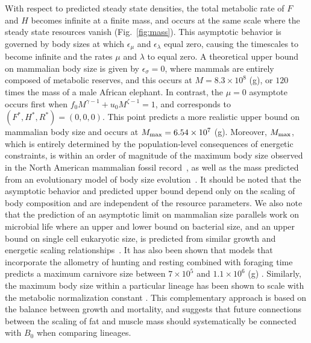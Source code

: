 \documentclass[twocolumn,preprintnumbers,amsmath,amssymb,superscriptaddress]{revtex4}
\begin{document}
With respect to predicted steady state densities, the total metabolic rate of $F$ and $H$ becomes infinite at a finite mass, and occurs at the same scale where the steady state resources vanish (Fig.~\ref{fig:mass}). This asymptotic behavior is governed by body sizes at which $\epsilon_{\mu}$ and $\epsilon_{\lambda}$ equal zero, causing the timescales to become infinite and the rates $\mu$ and $\lambda$ to equal zero.
A theoretical upper bound on mammalian body size is given by $\epsilon_\sigma=0$, where mammals are entirely composed of metabolic reserves, and this occurs at $M=8.3\times 10^8$ (g), or $120$ times the mass of a male African elephant.
In contrast, the $\mu=0$ asymptote occurs first when $f_{0}M^{\gamma-1}+u_{0}M^{\zeta-1}=1$, and corresponds to $(F^*,H^*,R^*)=(0,0,0)$. 
This point predicts a more realistic upper bound on mammalian body size and occurs at $M_{\rm max}=6.54\times10^7$ (g).
Moreover, $M_{\rm max}$, which is entirely determined by the population-level consequences of energetic constraints, is within an order of magnitude of the maximum body size observed in the North American mammalian fossil record~\citep{Alroy:1998p1594}, as well as the mass predicted from an evolutionary model of body size evolution~\citep{Clauset:2009fh}.
It should be noted that the asymptotic behavior and predicted upper bound depend only on the scaling of body composition and are independent of the resource parameters.
We also note that the prediction of an asymptotic limit on mammalian size parallels work on microbial life where an upper and lower bound on bacterial size, and an upper bound on single cell eukaryotic size, is predicted from similar growth and energetic scaling relationships~\citep{Kempes:2012hy,Kempes:2016}. 
It has also been shown that models that incorporate the allometry of hunting and resting combined with foraging time predicts a maximum carnivore size between $7\times10^{5}$ and $1.1\times10^{6}$ (g) \cite{Carbone:1999ju,carbone2007costs}. 
Similarly, the maximum body size within a particular lineage has been shown to scale with the metabolic normalization constant \cite{Okie:2013ju}. %
This complementary approach is based on the balance between growth and mortality, and suggests that future connections between the scaling of fat and muscle mass should systematically be connected with $B_{0}$ when comparing lineages. %
\end{document}
